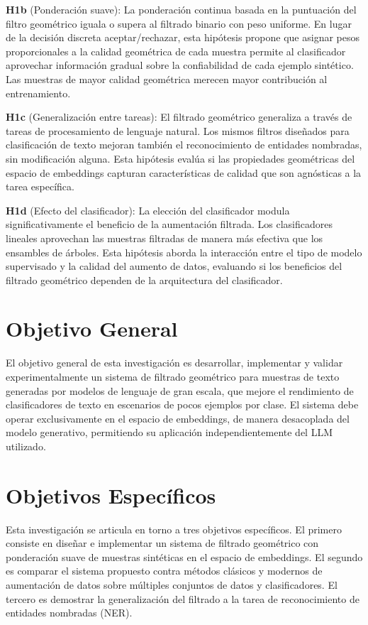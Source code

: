 \textbf{H1b} (Ponderación suave): La ponderación continua basada en la puntuación del filtro geométrico iguala o supera al filtrado binario con peso uniforme. En lugar de la decisión discreta aceptar/rechazar, esta hipótesis propone que asignar pesos proporcionales a la calidad geométrica de cada muestra permite al clasificador aprovechar información gradual sobre la confiabilidad de cada ejemplo sintético. Las muestras de mayor calidad geométrica merecen mayor contribución al entrenamiento.

\textbf{H1c} (Generalización entre tareas): El filtrado geométrico generaliza a través de tareas de procesamiento de lenguaje natural. Los mismos filtros diseñados para clasificación de texto mejoran también el reconocimiento de entidades nombradas, sin modificación alguna. Esta hipótesis evalúa si las propiedades geométricas del espacio de embeddings capturan características de calidad que son agnósticas a la tarea específica.

\textbf{H1d} (Efecto del clasificador): La elección del clasificador modula significativamente el beneficio de la aumentación filtrada. Los clasificadores lineales aprovechan las muestras filtradas de manera más efectiva que los ensambles de árboles. Esta hipótesis aborda la interacción entre el tipo de modelo supervisado y la calidad del aumento de datos, evaluando si los beneficios del filtrado geométrico dependen de la arquitectura del clasificador.

\section{Objetivo General}
\label{sec:objetivo_general}

El objetivo general de esta investigación es desarrollar, implementar y validar experimentalmente un sistema de filtrado geométrico para muestras de texto generadas por modelos de lenguaje de gran escala, que mejore el rendimiento de clasificadores de texto en escenarios de pocos ejemplos por clase. El sistema debe operar exclusivamente en el espacio de embeddings, de manera desacoplada del modelo generativo, permitiendo su aplicación independientemente del LLM utilizado.

\section{Objetivos Específicos}
\label{sec:objetivos_especificos}

Esta investigación se articula en torno a tres objetivos específicos. El primero consiste en diseñar e implementar un sistema de filtrado geométrico con ponderación suave de muestras sintéticas en el espacio de embeddings. El segundo es comparar el sistema propuesto contra métodos clásicos y modernos de aumentación de datos sobre múltiples conjuntos de datos y clasificadores. El tercero es demostrar la generalización del filtrado a la tarea de reconocimiento de entidades nombradas (NER).

